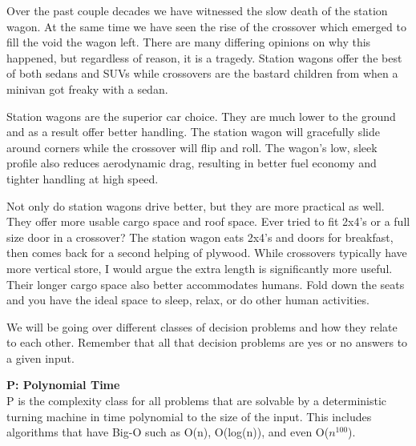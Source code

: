 \documentclass[9pt]{extarticle} %
\begin{document}
%
%
\begin{minipage}[t]{.61\linewidth} %
\vspace{-0.4cm}
\hypertarget{firstnews}{}

Over the past couple decades we have witnessed the slow death of the station wagon. At the same time we have seen the rise of the crossover which emerged to fill the void the wagon left. There are many differing opinions on why this happened, but regardless of reason, it is a tragedy. Station wagons offer the best of both sedans and SUVs while crossovers are the bastard children from when a minivan got freaky with a sedan.

Station wagons are the superior car choice. They are much lower to the ground and as a result offer better handling. The station wagon will gracefully slide around corners while the crossover will flip and roll. The wagon's low, sleek profile also reduces aerodynamic drag, resulting in better fuel economy and tighter handling at high speed. 

Not only do station wagons drive better, but they are more practical as well. They offer more usable cargo space and roof space. Ever tried to fit 2x4's or a full size door in a crossover? The station wagon eats 2x4's and doors for breakfast, then comes back for a second helping of plywood. While crossovers typically have more vertical store, I would argue the extra length is significantly more useful. Their longer cargo space also better accommodates humans. Fold down the seats and you have the ideal space to sleep, relax, or do other human activities.


\hypertarget{secondnews}{} 

We will be going over different classes of decision problems and how they relate to each other. Remember that all that decision problems are yes or no answers to a given input.

\textbf{P: Polynomial Time} \\
P is the complexity class for all problems that are solvable by a deterministic turning machine in time polynomial to the size of the input. This includes algorithms that have Big-O such as O(n), O(log(n)), and even O($n^{100}$). 


\end{minipage}
\end{document}

